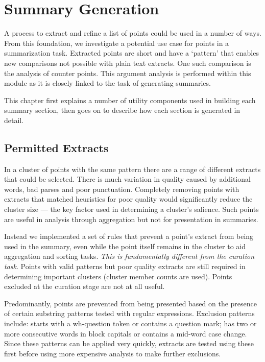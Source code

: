 \chapter{Summary Generation\label{chap:summary-generation}}
  A process to extract and refine a list of points could be used in a number of ways. From this foundation, we investigate a potential use case for points in a summarization task. Extracted points are short and have a `pattern' that enables new comparisons not possible with plain text extracts. One such comparison is the analysis of counter points. This argument analysis is performed within this module as it is closely linked to the task of generating summaries.

  This chapter first explains a number of utility components used in building each summary section, then goes on to describe how each section is generated in detail.

  \section{Permitted Extracts}
    In a cluster of points with the same pattern there are a range of different extracts that could be selected. There is much variation in quality caused by additional words, bad parses and poor punctuation. Completely removing points with extracts that matched heuristics for poor quality would significantly reduce the cluster size --- the key factor used in determining a cluster's salience. Such points are useful in analysis through aggregation but not for presentation in summaries.

    Instead we implemented a set of rules that prevent a point's extract from being used in the summary, even while the point itself remains in the cluster to aid aggregation and sorting tasks. \textit{This is fundamentally different from the curation task}. Points with valid patterns but poor quality extracts are still required in determining important clusters (cluster member counts are used). Points excluded at the curation stage are not at all useful.

    Predominantly, points are prevented from being presented based on the presence of certain substring patterns tested with regular expressions. Exclusion patterns include: starts with a wh-question token or contains a question mark; has two or more consecutive words in block capitals or contains a mid-word case change. Since these patterns can be applied very quickly, extracts are tested using these first before using more expensive analysis to make further exclusions.

